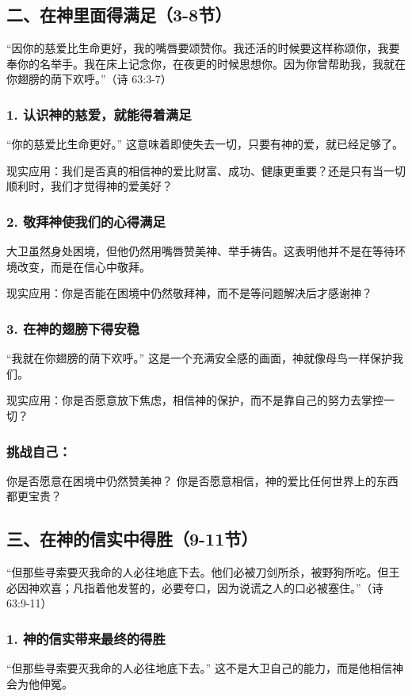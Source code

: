 \documentclass[a4paper, 12pt]{article}
\begin{document}
\subsection*{二、在神里面得满足（3-8节）}
“因你的慈爱比生命更好，我的嘴唇要颂赞你。我还活的时候要这样称颂你，我要奉你的名举手。我在床上记念你，在夜更的时候思想你。因为你曾帮助我，我就在你翅膀的荫下欢呼。”（诗 63:3-7）

\subsubsection*{1. 认识神的慈爱，就能得着满足}
“你的慈爱比生命更好。” 这意味着即使失去一切，只要有神的爱，就已经足够了。

现实应用：我们是否真的相信神的爱比财富、成功、健康更重要？还是只有当一切顺利时，我们才觉得神的爱美好？
\subsubsection*{2. 敬拜神使我们的心得满足}
\hspace{0.6cm}大卫虽然身处困境，但他仍然用嘴唇赞美神、举手祷告。这表明他并不是在等待环境改变，而是在信心中敬拜。

现实应用：你是否能在困境中仍然敬拜神，而不是等问题解决后才感谢神？
\subsubsection*{3. 在神的翅膀下得安稳}
“我就在你翅膀的荫下欢呼。” 这是一个充满安全感的画面，神就像母鸟一样保护我们。

现实应用：你是否愿意放下焦虑，相信神的保护，而不是靠自己的努力去掌控一切？
\subsubsection*{挑战自己：}
你是否愿意在困境中仍然赞美神？
你是否愿意相信，神的爱比任何世界上的东西都更宝贵？
\subsection*{三、在神的信实中得胜（9-11节）}
“但那些寻索要灭我命的人必往地底下去。他们必被刀剑所杀，被野狗所吃。但王必因神欢喜；凡指着他发誓的，必要夸口，因为说谎之人的口必被塞住。”（诗 63:9-11）

\subsubsection*{1. 神的信实带来最终的得胜}
“但那些寻索要灭我命的人必往地底下去。” 这不是大卫自己的能力，而是他相信神会为他伸冤。
\end{document}

